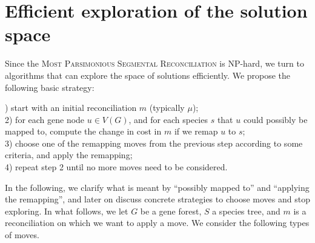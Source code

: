 \documentclass[10pt]{article}
\begin{document}
\section{Efficient exploration of the solution space}

Since the \textsc{Most Parsimonious Segmental Reconciliation} is NP-hard, we turn to algorithms that can explore the space of solutions efficiently.  
We propose the following basic strategy:  

\medskip

) start with an initial reconciliation $m$ (typically $\mu$); \\
2) for each gene node $u \in V(G)$, and for each species $s$ that $u$ could possibly be mapped to, compute the change in cost in $m$ if we remap $u$ to $s$; \\
3) choose one of the remapping moves from the previous step according to some criteria, and apply the remapping; \\
4) repeat step 2 until no more moves need to be considered.

\medskip

In the following, we clarify what is meant by ``possibly mapped to'' and ``applying the remapping'', and later on discuss concrete strategies to choose moves and stop exploring. 
In what follows, we let $G$ be a gene forest, $S$ a species tree, and $m$ is a reconciliation on which we want to apply a move.  We consider the following types of moves.
\end{document}
